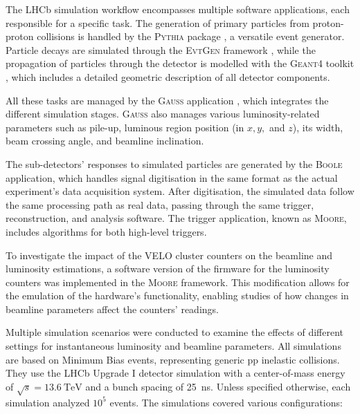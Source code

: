 The LHCb simulation workflow encompasses multiple software applications, each responsible for a specific task. The generation of primary particles from proton-proton collisions is handled by the \textsc{Pythia} package \cite{Sj_strand_2006}, a versatile event generator. Particle decays are simulated through the \textsc{EvtGen} framework \cite{Lange:2001uf}, while the propagation of particles through the detector is modelled with the \textsc{Geant4} toolkit \cite{Agostinelli:2002hh}, which includes a detailed geometric description of all detector components.

All these tasks are managed by the \textsc{Gauss} application \cite{Miglioranzi:1322402}, which integrates the different simulation stages. \textsc{Gauss} also manages various luminosity-related parameters such as pile-up, luminous region position (in \(x, y,\) and \(z\)), its width, beam crossing angle, and beamline inclination.

The sub-detectors' responses to simulated particles are generated by the \textsc{Boole} application, which handles signal digitisation in the same format as the actual experiment's data acquisition system. After digitisation, the simulated data follow the same processing path as real data, passing through the same trigger, reconstruction, and analysis software. The trigger application, known as \textsc{Moore}, includes algorithms for both high-level triggers. 

To investigate the impact of the VELO cluster counters on the beamline and luminosity estimations, a software version of the firmware for the luminosity counters was implemented in the \textsc{Moore} framework. This modification allows for the emulation of the hardware's functionality, enabling studies of how changes in beamline parameters affect the counters' readings.

Multiple simulation scenarios were conducted to examine the effects of different settings for instantaneous luminosity and beamline parameters. All simulations are based on Minimum Bias events, representing generic pp inelastic collisions. They use the LHCb Upgrade I detector simulation with a center-of-mass energy of $\sqrt{s} = \SI{13.6}{\tera\eV}$ and a bunch spacing of \SI{25}{\nano\second}. Unless specified otherwise, each simulation analyzed $10^5$ events. The simulations covered various configurations:

